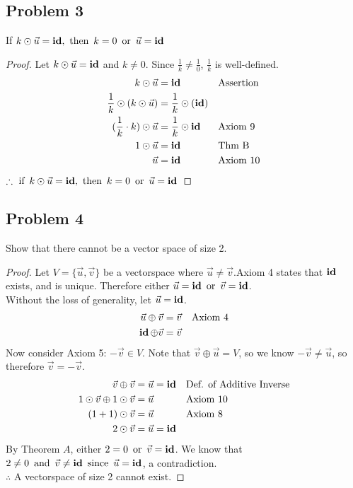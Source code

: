 \subsection*{Problem 3}
 If $k \odot \vec{u} = \operatorname{\textbf{id}}, \operatorname{~\text{then}~} k=0 \operatorname{~\text{or}~} \vec{u} = \operatorname{\textbf{id}}$
\begin{proof}
  Let $k \odot \vec{u} = \operatorname{\textbf{id}}$ and $k \neq 0 $. Since $\frac{1}{k} \neq \frac{1}{0}$, $\frac{1}{k}$ is well-defined.
  \begin{align*}
    k \odot \vec{u}                     & = \operatorname{\textbf{id}}                     &  & \text{Assertion} \\
    \frac{1}{k} \odot (k \odot \vec{u}) & = \frac{1}{k} \odot (\operatorname{\textbf{id}})                       \\
    (\frac{1}{k} \cdot k) \odot \vec{u} & = \frac{1}{k} \odot \operatorname{\textbf{id}}   &  & \text{Axiom 9}   \\
    1 \odot \vec{u}                     & = \operatorname{\textbf{id}}                     &  & \text{Thm B}     \\
    \vec{u}                             & = \operatorname{\textbf{id}}                     &  & \text{Axiom 10}
  \end{align*}
  $\therefore \operatorname{~\text{if}~} k \odot \vec{u} = \operatorname{\textbf{id}}, \operatorname{~\text{then}~} k=0 \operatorname{~\text{or}~} \vec{u} = \operatorname{\textbf{id}}$
\end{proof}

\subsection*{Problem 4}
Show that there cannot be a vector space of size 2.
\begin{proof}
  Let $V = \{\vec{u}, \vec{v}\}$ be a vectorspace where $\vec{u} \neq \vec{v}$.Axiom 4 states that $\operatorname{\textbf{id}}$ exists, and is unique. Therefore either $\vec{u} = \operatorname{\textbf{id}} \operatorname{~\text{or}~} \vec{v} = \operatorname{\textbf{id}}$. \\
  Without the loss of generality, let $\vec{u} = \operatorname{\textbf{id}}$.
  \begin{align*}
    \vec{u} \oplus \vec{v} & = \vec{v} & \text{Axiom 4} \\
    \operatorname{\textbf{id}} \oplus \vec{v}     & = \vec{v}
  \end{align*}
  Now consider Axiom 5: $-\vec{v} \in V$. Note that $\vec{v} \oplus \vec{u} = V$, so we know $-\vec{v} \neq \vec{u}$, so therefore $\vec{v} = -\vec{v}$.
  \begin{align*}
    \vec{v} \oplus \vec{v}                 & = \vec{u} = \operatorname{\textbf{id}} &  & \text{Def. of Additive Inverse} \\
    1 \odot \vec{v} \oplus 1 \odot \vec{v} & = \vec{u}       &  & \text{Axiom 10}                 \\
    (1+1) \odot \vec{v}                    & = \vec{u}       &  & \text{Axiom 8}                  \\
    2 \odot \vec{v}                        & = \vec{u} = \operatorname{\textbf{id}}
  \end{align*}
  By Theorem $A$, either $2 = 0 \operatorname{~\text{or}~} \vec{v} = \operatorname{\textbf{id}}$. We know that $2 \neq 0 \operatorname{~\text{and}~} \vec{v} \neq \operatorname{\textbf{id}} \operatorname{~\text{since}~} \vec{u} = \operatorname{\textbf{id}}$, a contradiction. \\
  $\therefore$ A vectorspace of size 2 cannot exist.

\end{proof}
